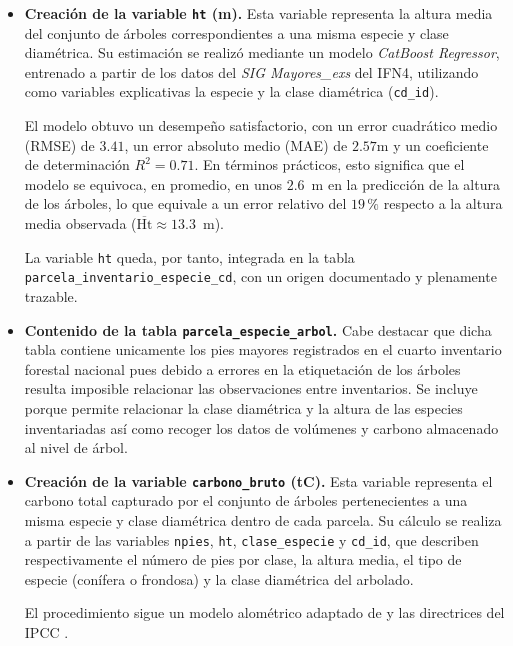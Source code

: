 \begin{itemize}
    \medskip

    \item \textbf{Creación de la variable \texttt{ht} (m).} Esta variable representa la altura media del conjunto de árboles correspondientes a una misma especie y clase diamétrica. Su estimación se realizó mediante un modelo \textit{CatBoost Regressor}, entrenado a partir de los datos del \textit{SIG Mayores\_exs} del IFN4, utilizando como variables explicativas la especie y la clase diamétrica (\texttt{cd\_id}).  

    \medskip

    El modelo obtuvo un desempeño satisfactorio, con un error cuadrático medio (RMSE) de $3.41$, un error absoluto medio (MAE) de $2.57$m y un coeficiente de determinación $R^2 = 0.71$. En términos prácticos, esto significa que el modelo se equivoca, en promedio, en unos $2.6$~m en la predicción de la altura de los árboles, lo que equivale a un error relativo del $19\,\%$ respecto a la altura media observada ($\overline{\text{Ht}} \approx 13.3$~m).
    
    \medskip

    La variable \texttt{ht} queda, por tanto, integrada en la tabla \texttt{parcela\_inventario\_especie\_cd}, con un origen documentado y plenamente trazable.

    \medskip

    \item \textbf{Contenido de la tabla \texttt{parcela\_especie\_arbol}.} Cabe destacar que dicha tabla contiene unicamente los pies mayores registrados en el cuarto inventario forestal nacional pues debido a errores en la etiquetación de los árboles resulta imposible relacionar las observaciones entre inventarios. Se incluye porque permite relacionar la clase diamétrica y la altura de las especies inventariadas así como recoger los datos de volúmenes y carbono almacenado al nivel de árbol. 

    \item \textbf{Creación de la variable \texttt{carbono\_bruto} (tC).}  Esta variable representa el carbono total capturado por el conjunto de árboles pertenecientes a una misma especie y clase diamétrica dentro de cada parcela.  
    Su cálculo se realiza a partir de las variables \texttt{npies}, \texttt{ht}, \texttt{clase\_especie} y \texttt{cd\_id}, que describen respectivamente el número de pies por clase, la altura media, el tipo de especie (conífera o frondosa) y la clase diamétrica del arbolado.
    
    El procedimiento sigue un modelo alométrico adaptado de \cite{chave2014} y las directrices del IPCC \cite{ipcc2006}. 
    

\end{itemize}
